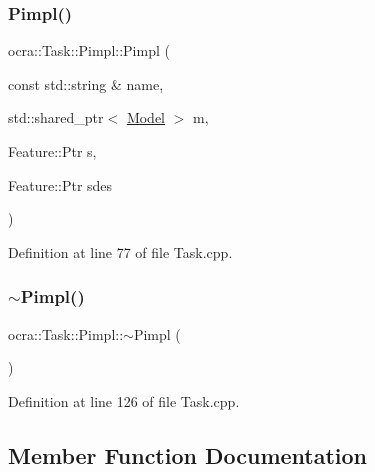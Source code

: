 \subsubsection{\texorpdfstring{Pimpl()}{Pimpl()}}
{\footnotesize\ttfamily ocra\+::\+Task\+::\+Pimpl\+::\+Pimpl (\begin{DoxyParamCaption}\item[{const std\+::string \&}]{name,  }\item[{std\+::shared\+\_\+ptr$<$ \hyperlink{classocra_1_1Model}{Model} $>$}]{m,  }\item[{Feature\+::\+Ptr}]{s,  }\item[{Feature\+::\+Ptr}]{sdes }\end{DoxyParamCaption})\hspace{0.3cm}{\ttfamily [inline]}}



Definition at line 77 of file Task.\+cpp.

\hypertarget{structocra_1_1Task_1_1Pimpl_ae00df5386f25d40f820ef4bc1296ea4a}{}\label{structocra_1_1Task_1_1Pimpl_ae00df5386f25d40f820ef4bc1296ea4a} 
\subsubsection{\texorpdfstring{$\sim$\+Pimpl()}{~Pimpl()}}
{\footnotesize\ttfamily ocra\+::\+Task\+::\+Pimpl\+::$\sim$\+Pimpl (\begin{DoxyParamCaption}{ }\end{DoxyParamCaption})\hspace{0.3cm}{\ttfamily [inline]}}



Definition at line 126 of file Task.\+cpp.



\subsection{Member Function Documentation}
\hypertarget{structocra_1_1Task_1_1Pimpl_aabf390e84dff086a53ea876fad5755c5}{}\label{structocra_1_1Task_1_1Pimpl_aabf390e84dff086a53ea876fad5755c5} 
